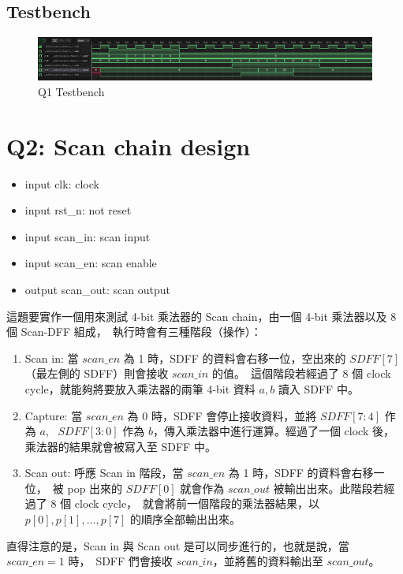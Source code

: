 \documentclass[10.5pt,compsoc,UTF8]{CjC}
\theoremstyle{mystyle}
\begin{document}
\subsection{Testbench}
\begin{figure}[h!]
  \centering
  \includegraphics[width=\textwidth]{./img/Q1-tb.png}
  \caption{Q1 Testbench}
  \label{fig:Q1-tb}
\end{figure}

\section{Q2: Scan chain design}
\begin{itemize}
  \item input clk: clock
  \item input rst\_n: not reset
  \item input scan\_in: scan input
  \item input scan\_en: scan enable
  \item output scan\_out: scan output
\end{itemize}

這題要實作一個用來測試 4-bit 乘法器的 Scan chain，由一個 4-bit 乘法器以及 8 個 Scan-DFF 組成，\
執行時會有三種階段（操作）：
\begin{enumerate}
  \item Scan in: 當 $scan\_en$ 為 1 時，SDFF 的資料會右移一位，空出來的 $SDFF[7]$（最左側的 SDFF）則會接收 $scan\_in$ 的值。\
  這個階段若經過了 8 個 clock cycle，就能夠將要放入乘法器的兩筆 4-bit 資料 $a, b$ 讀入 SDFF 中。
  \item Capture: 當 $scan\_en$ 為 0 時，SDFF 會停止接收資料，並將 $SDFF[7:4]$ 作為 $a$, \
  $SDFF[3:0]$ 作為 $b$，傳入乘法器中進行運算。經過了一個 clock 後，乘法器的結果就會被寫入至 SDFF 中。
  \item Scan out: 呼應 Scan in 階段，當 $scan\_en$ 為 1 時，SDFF 的資料會右移一位，\
  被 pop 出來的 $SDFF[0]$ 就會作為 $scan\_out$ 被輸出出來。此階段若經過了 $8$ 個 clock cycle，\
  就會將前一個階段的乘法器結果，以 $p[0], p[1], \dots, p[7]$ 的順序全部輸出出來。
\end{enumerate}

直得注意的是，Scan in 與 Scan out 是可以同步進行的，也就是說，當 $scan\_en = 1$ 時，\
SDFF 們會接收 $scan\_in$，並將舊的資料輸出至 $scan\_out$。
\end{document}
